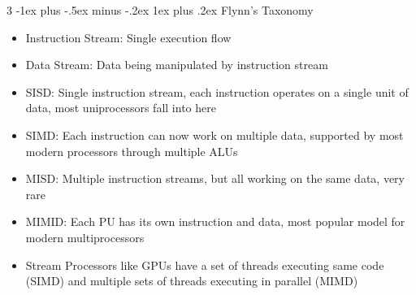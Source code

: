 \documentclass[10pt, landscape]{article}
\makeatletter
\renewcommand{\subsection}{\@startsection{subsection}{3}{0mm}%
                                {-1ex plus -.5ex minus -.2ex}%
                                {1ex plus .2ex}%
                                {\normalfont\small\bfseries}}%
\makeatother
\begin{document}
\begin{multicols*}{3}
\subsection{Flynn's Taxonomy}
\begin{itemize}
    \item Instruction Stream: Single execution flow
    \item Data Stream: Data being manipulated by instruction stream
    \item SISD: Single instruction stream, each instruction operates on a single unit of data, most uniprocessors fall into here
    \item SIMD: Each instruction can now work on multiple data, supported by most modern processors through multiple ALUs
    \item MISD: Multiple instruction streams, but all working on the same data, very rare
    \item MIMID: Each PU has its own instruction and data, most popular model for modern multiprocessors
    \item Stream Processors like GPUs have a set of threads executing same code (SIMD) and multiple sets of threads executing in parallel (MIMD)
\end{itemize}


\end{multicols*}
\end{document}
